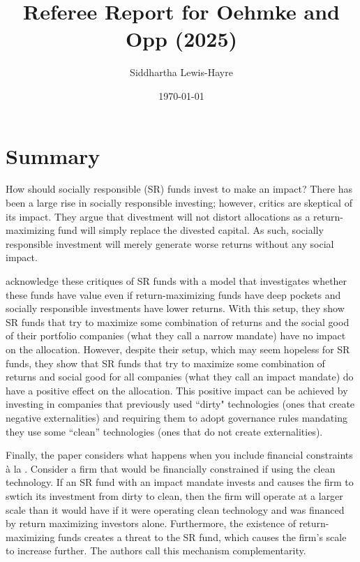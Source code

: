 \documentclass[12pt]{article}
\title{Referee Report for Oehmke and Opp (2025)}
\author{Siddhartha Lewis-Hayre}
\date{\today}
\begin{document}
\maketitle


\section{Summary}

How should socially responsible (SR) funds invest to make an impact? There has been a large rise in socially responsible investing; however, critics are skeptical of its impact. They argue that divestment will not distort allocations as a return-maximizing fund will simply replace the divested capital. As such, socially responsible investment will merely generate worse returns without any social impact.

\citet{oehmke_opp_2025} acknowledge these critiques of SR funds with a model that investigates whether these funds have value even if return-maximizing funds have deep pockets and socially responsible investments have lower returns. With this setup, they show SR funds that try to maximize some combination of returns and the social good of their portfolio companies (what they call a narrow mandate) have no impact on the allocation. However, despite their setup, which may seem hopeless for SR funds, they show that SR funds that try to maximize some combination of returns and social good for all companies (what they call an impact mandate) do have a positive effect on the allocation. This positive impact can be achieved by investing in companies that previously used ``dirty" technologies (ones that create negative externalities) and requiring them to adopt governance rules mandating they use some ``clean'' technologies (ones that do not create externalities).

Finally, the paper considers what happens when you include financial constraints \`a la \citet{holmstrom_tirole_1997}. Consider a firm that would be financially constrained if using the clean technology. If an SR fund with an impact mandate invests and causes the firm to swtich its investment from dirty to clean, then the firm will operate at a larger scale than it would have if it were operating clean technology and was financed by return maximizing investors alone. Furthermore, the existence of return-maximizing funds creates a threat to the SR fund, which causes the firm's scale to increase further. The authors call this mechanism complementarity.
\end{document}

